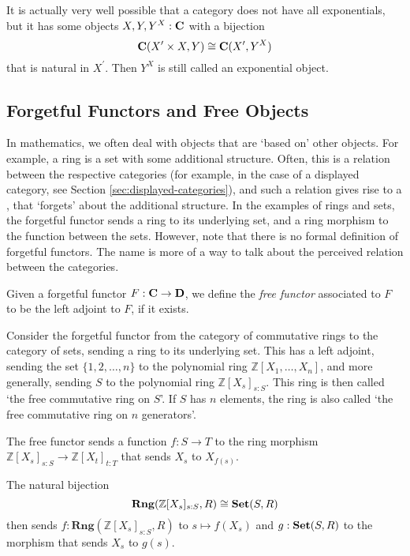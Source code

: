 \begin{remark}
  It is actually very well possible that a category does not have all exponentials, but it has some objects $ X, Y, Y^X: \mathbf{C} $ with a bijection
  \[ \mathbf{C}(X^\prime \times X, Y) \cong \mathbf{C}(X^\prime, Y^X) \]
  that is natural in $ X^\prime $. Then $ Y^X $ is still called an exponential object.
\end{remark}

\subsection{Forgetful Functors and Free Objects}

In mathematics, we often deal with objects that are `based on' other objects. For example, a ring is a set with some additional structure. Often, this is a relation between the respective categories (for example, in the case of a displayed category, see Section \ref{sec:displayed-categories}), and such a relation gives rise to a , that `forgets' about the additional structure. In the examples of rings and sets, the forgetful functor sends a ring to its underlying set, and a ring morphism to the function between the sets. However, note that there is no formal definition of forgetful functors. The name is more of a way to talk about the perceived relation between the categories.

\begin{definition}
  Given a forgetful functor $ F: \mathbf{C} \to \mathbf{D} $, we define the \textit{free functor} associated to $ F $ to be the left adjoint to $ F $, if it exists.
\end{definition}

\begin{example}
  Consider the forgetful functor from the category of commutative rings to the category of sets, sending a ring to its underlying set. This has a left adjoint, sending the set $ \{ 1, 2, \dots, n \} $ to the polynomial ring $ \mathbb Z[X_1, \dots, X_n] $, and more generally, sending $ S $ to the polynomial ring $ \mathbb Z[X_s]_{s : S} $. This ring is then called `the free commutative ring on $ S $'. If $ S $ has $ n $ elements, the ring is also called `the free commutative ring on $ n $ generators'.

  The free functor sends a function $ f: S \to T $ to the ring morphism $ \mathbb Z[X_s]_{s: S} \to \mathbb Z[X_t]_{t: T} $ that sends $ X_s $ to $ X_{f(s)} $.

  The natural bijection
  \[ \mathbf{Rng}(\mathbb Z[X_s]_{s : S}, R) \cong \mathbf{Set}(S, R) \]
  then sends $ f: \mathbf{Rng}(\mathbb Z[X_s]_{s : S}, R) $ to $ s \mapsto f(X_s) $ and $ g: \mathbf{Set}(S, R) $ to the morphism that sends $ X_s $ to $ g(s) $.
\end{example}

